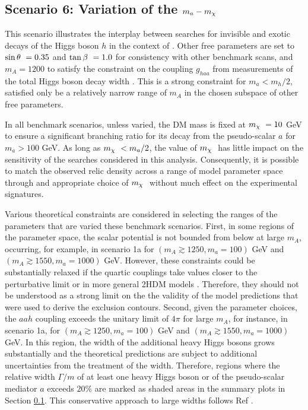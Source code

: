 \subsection{Scenario 6: Variation of the \texorpdfstring{$m_a-m_{\chi}~$}{TEXT} }
\label{subsection:ma-mchi-scan}
This scenario illustrates the interplay between searches for invisible and exotic decays of the Higgs boson $h$ in the context of \hdma. Other free parameters are set to $\sin\theta~=0.35$ and $\tan\beta~=1.0$ for consistency with other benchmark scans, and $m_A=1200$ to satisfy the constraint on the coupling $g_{haa}$ from measurements of the total Higgs boson decay width \cite{Argyropoulos:2022ezr}. This is a strong constraint for $m_a<m_h/2$, satisfied only be a relatively narrow range of $m_A$ in the chosen subspace of other free parameters.

In all benchmark scenarios, unless varied, the DM mass is fixed at $m_{\chi}~=10$ GeV to ensure a significant branching ratio for its decay from the pseudo-scalar $a$ for $m_a>100$ GeV. As long as $m_{\chi}~<m_a/2$, the value of $m_{\chi}~$ has little impact on the sensitivity of the searches considered in this analysis. Consequently, it is possible to match the observed relic density across a range of model parameter space through and appropriate choice of $m_{\chi}~$ without much effect on the experimental signatures.

Various theoretical constraints are considered in selecting the ranges of the parameters that are varied these benchmark scenarios. First, in some regions of the parameter space, the scalar potential is not bounded from below at large $m_A$, occurring, for example, in scenario 1a for $(m_A\gtrsim1250,m_a=100)$ GeV and $(m_A\gtrsim1550,m_a=1000)$ GeV. However, these constraints could be substantially relaxed if the quartic couplings take values closer to the perturbative limit or in more general 2HDM models \cite{2HDMWGproxi,Bauer:2017ota,Haisch:2018djm}. Therefore, they should not be understood as a strong limit on the the validity of the model predictions that were used to derive the exclusion contours. Second, given the parameter choices, the $aah$ coupling exceeds the unitary limit of $4\pi$ for large $m_A$, for instance, in scenario 1a, for $(m_A\gtrsim1250,m_a=100)$ GeV and $(m_A\gtrsim1550,m_a=1000)$ GeV. In this region, the width of the additional heavy Higgs bosons grows substantially and the theoretical predictions are subject to additional uncertainties from the treatment of the width. Therefore, regions where the relative width $\Gamma/m$ of at least one heavy Higgs boson or of the pseudo-scalar mediator $a$ exceeds $20\%$ are marked as shaded areas in the summary plots in Section \ref{subsection:ma-mchi-scan}. This conservative approach to large widths follows Ref \cite{EXOT-2017-32}.

